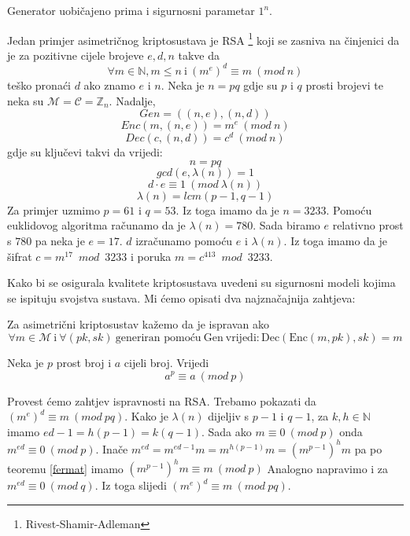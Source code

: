 \documentclass{mathos}
\begin{document}
\begin{nap}
    Generator uobičajeno prima i sigurnosni parametar $1^n$.
\end{nap}

\begin{primjer}[RSA]
    Jedan primjer asimetričnog kriptosustava je RSA \footnote{Rivest-Shamir-Adleman} koji se zasniva na činjenici da je za pozitivne cijele brojeve $e,d,n$ takve da \[\forall m\in\mathbb{N}, m\leq n \  \text{i} \  (m^e)^d \equiv m \  (mod \ n)\] teško pronaći $d$ ako znamo $e$ i $n$. Neka je $n = pq$ gdje su $p$ i $q$ prosti brojevi te neka su $\mathcal{M} = \mathcal{C} = \mathbb{Z}_n$. Nadalje,
    \[ Gen = ((n, e), (n, d)) \]
    \[ Enc(m, (n, e)) =  m^e \  (mod \ n) \]
    \[ Dec(c, (n, d)) = c^d \  (mod \ n) \]
    gdje su ključevi takvi da vrijedi:
    \[n = pq\] 
    \[gcd(e,\lambda(n)) = 1\]
    \[d \cdot e \equiv 1 \  (mod\ \lambda(n))\]
    \[\lambda(n)=lcm(p-1, q-1)\]
    Za primjer uzmimo $p = 61$ i $q = 53$. Iz toga imamo da je $n = 3233$. Pomoću euklidovog algoritma računamo da je $\lambda(n) = 780$. Sada biramo $e$ relativno prost s $780$ pa neka je $e = 17$. $d$ izračunamo pomoću $e$ i $\lambda(n)$. Iz toga imamo da je šifrat $c = m^{17}\enspace mod \enspace 3233$ i poruka $m = c^{413} \enspace mod \enspace 3233$.
\end{primjer}

Kako bi se osigurala kvalitete kriptosustava uvedeni su sigurnosni modeli kojima se ispituju svojstva sustava. Mi ćemo opisati dva najznačajnija zahtjeva:

\begin{defin}
    Za asimetrični kriptosustav kažemo da je ispravan ako
    \[\forall m \in \mathcal{M} \  \text{i} \  \forall (pk, sk) \  \text{generiran pomoću} \  \text{Gen} \  \text{vrijedi}:
    \text{Dec}(\text{Enc}(m, pk), sk) = m \]
\end{defin}

\begin{theorem}
    \label{fermat}
    Neka je $p$ prost broj i $a$ cijeli broj. Vrijedi
    \[ a^p \equiv a \  (mod \  p) \]
\end{theorem}

\begin{primjer}
    Provest ćemo zahtjev ispravnosti na RSA. Trebamo pokazati da $(m^e)^d \equiv m \  (mod \  pq)$.
    Kako je $\lambda(n)$ dijeljiv s $p-1$ i $q-1$, za $k, h \in \mathbb{N}$ imamo $ed - 1 = h(p - 1) = k(q - 1)$.
    Sada ako $m \equiv 0 \  (mod \  p)$ onda $m^{ed} \equiv 0 \ (mod \  p)$. Inače $m^{ed} = m^{ed-1}m = m^{h(p-1)}m = (m^{p-1})^hm$
    pa po teoremu \ref{fermat} imamo $(m^{p-1})^hm \equiv m \ (mod \ p)$
    Analogno napravimo i za $m^{ed} \equiv 0 \ (mod \  q)$.
    Iz toga slijedi $(m^e)^d \equiv m \ (mod \ pq)$.
\end{primjer}
\end{document}

